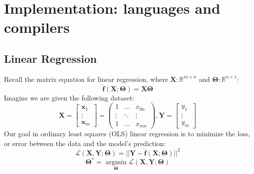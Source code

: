 \documentclass[12pt,initial,twoside,maitrise]{dms}
\numberwithin{equation}{section}
\numberwithin{table}{chapter}
\numberwithin{figure}{chapter}
\begin{document}


%
%




\appendix
\chapter{Implementation: languages and compilers}

\section{Linear Regression}

\noindent Recall the matrix equation for linear regression, where $\mathbf{X}: \mathbb{R}^{m \times n}$ and $\mathbf{\Theta}: \mathbb{R}^{n \times 1}$:
%
\begin{equation}
\mathbf{\hat f}(\mathbf{X}; \mathbf{\Theta}) = \mathbf{X}\mathbf{\Theta}
\end{equation}
%
Imagine we are given the following dataset:
%
\begin{equation}
\mathbf{X} =
\begin{bmatrix}
\mathbf{x}_1 \\
\vdots \\
\mathbf{x}_m
\end{bmatrix} =
\begin{pmatrix}
1 & \ldots & x_{0n} \\
\vdots & \ddots & \vdots \\
1 & \ldots & x_{mn}
\end{pmatrix},
\mathbf{Y} =
\begin{bmatrix}
y_1 \\
\vdots \\
y_m
\end{bmatrix}
\end{equation}
%
Our goal in ordinary least squares (OLS) linear regression is to minimize the loss, or error between the data and the model's prediction:
%
\begin{equation}
\mathcal{L}(\mathbf{X}, \mathbf{Y}; \mathbf{\Theta}) = ||\mathbf{Y} - \mathbf{\hat f}(\mathbf{X}; \mathbf{\Theta})||^2
\end{equation}
%
\begin{equation}
\mathbf{\Theta}^* = \underset{\mathbf{\Theta}}{\operatorname{argmin}}\mathcal{L}(\mathbf{X}, \mathbf{Y}; \mathbf{\Theta})
\end{equation}
\end{document}
